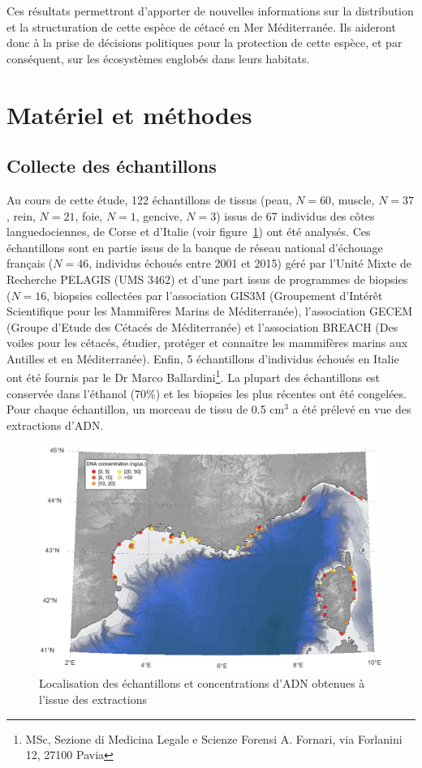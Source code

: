\documentclass[a4paper,12pt,twoside]{article}\usepackage[]{graphicx}\usepackage[]{color}
\begin{document}
Ces résultats permettront d'apporter de nouvelles informations sur la distribution et la structuration de cette espèce de cétacé en Mer Méditerranée. Ils aideront donc à la prise de décisions politiques pour la protection de cette espèce, et par conséquent, sur les écosystèmes englobés dans leurs habitats.


\section{Matériel et méthodes} 

\subsection{Collecte des échantillons} 
Au cours de cette étude, 122 échantillons de tissus (peau, $N= 60$, muscle, $N= 37$, rein, $N= 21$, foie, $N= 1$, gencive, $N= 3$) issus de 67 individus des côtes languedociennes, de Corse et d'Italie (voir figure~\ref{fig:concentration}) ont été analysés. Ces échantillons sont en partie issus de la banque de réseau national d'échouage français ($N= 46$, individus échoués entre 2001 et 2015) géré par l'Unité Mixte de Recherche PELAGIS (UMS 3462) et d'une part issus de programmes de biopsies ($N= 16$, biopsies collectées par l'association GIS3M (Groupement d'Intérêt Scientifique pour les Mammifères Marins de Méditerranée), l'association GECEM (Groupe d'Etude des Cétacés de Méditerranée) et l'association BREACH (Des voiles pour les cétacés, étudier, protéger et connaitre les mammifères marins aux Antilles et en Méditerranée). Enfin, 5 échantillons d'individus échoués en Italie ont été fournis par le Dr Marco Ballardini\footnote{MSc, Sezione di Medicina Legale e Scienze Forensi A. Fornari, via Forlanini 12, 27100 Pavia}. La plupart des échantillons est conservée dans l'éthanol (70\%) et les biopsies les plus récentes ont été congelées. Pour chaque échantillon, un morceau de tissu de 0.5 cm$^3$ a été prélevé en vue des extractions d'ADN.

\begin{figure}[htbp]
	\centering
		\includegraphics[width=\textwidth]{concentrations.png}
	\caption{Localisation des échantillons et concentrations d'ADN obtenues à l'issue des extractions}
	\label{fig:concentration}
\end{figure}
\end{document}
